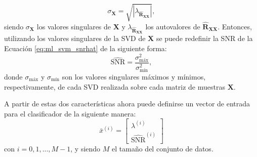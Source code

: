 \begin{equation}
  \sigma_{\mathbf{X}} = \sqrt{|\lambda_{\mathbf{\hat{R}_{XX}}}|},
\end{equation}
siendo $\sigma_{\mathbf{X}}$ los valores singulares de $\mathbf{X}$ y $\lambda_{\mathbf{\hat{R}_{XX}}}$ los autovalores de $\mathbf{\hat{R}_{XX}}$. Entonces, utilizando los valores singulares de la SVD de $\mathbf{X}$ se puede redefinir la SNR de la Ecuación \ref{eq:ml_svm_snrhat} de la siguiente forma:
\begin{equation}
  \hat{\mathrm{SNR}} = \frac{\sigma^2_{\textrm{máx}}}{\sigma^2_{\textrm{mín}}},
  \label{eq:ml_svm_snrhatsvd}
\end{equation}
donde $\sigma_{\textrm{máx}}$ y $\sigma_{\textrm{mín}}$ son los valores singulares máximos y mínimos, respectivamente, de cada SVD realizada sobre cada matriz de muestras $\mathbf{X}$.

A partir de estas dos características ahora puede definirse un vector de entrada para el clasificador de la siguiente manera:
\begin{equation}
  \bar{x}^{(i)}=\begin{bmatrix}
    \lambda^{(i)} \\
    \hat{\mathrm{SNR}}^{(i)}
  \end{bmatrix}
  \label{eq:ml_svm_x}
\end{equation}
con $i=0,1,...,M-1$, y siendo $M$ el tamaño del conjunto de datos.

